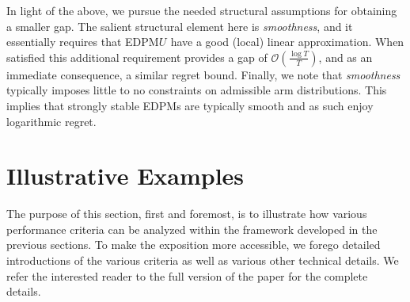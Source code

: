 \documentclass[final,12pt]{colt2018}
\newcommand{\EDRMabbrv}{EDPM}
\newcommand{\RHat}[1][]{{U}^{#1}}
\begin{document}
	In light of the above, we pursue the needed structural assumptions for obtaining a smaller gap. The salient structural element here is  \emph{smoothness}, and it essentially requires that \EDRMabbrv\space $\RHat$ have a good (local) linear approximation. When satisfied this additional requirement provides a gap of $\mathcal{O}(\frac{\log T}{T})$, and as an immediate consequence, a similar regret bound. Finally, we note that \emph{smoothness} typically imposes little to no constraints on admissible arm distributions. This implies that strongly stable \EDRMabbrv s are typically smooth and as such enjoy logarithmic regret. 
	
	
	
	
	
	
	
	
	
	
	
	
	
	
	
	
	
	
	
	
	
	
	
	
	
	
	
	
	
	
	
	
	
	
	
	
	
	
	
	
	
	
	
	
	
	
	
	
	
	
	
	
	
	
	
	
		
	
	\section{Illustrative Examples} \label{sec:examples}
	The purpose of this section, first and foremost, is to illustrate how various performance criteria can be analyzed within the framework developed in the previous sections. To make the exposition more accessible, we forego detailed introductions of the various criteria as well as various other technical details. We refer the interested reader to the full version of the paper for the complete details.
	
\end{document}
